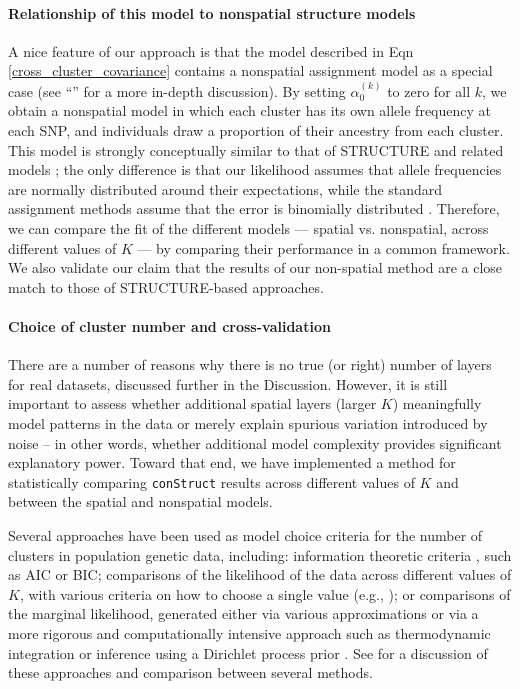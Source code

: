 \documentclass[12pt]{article}
\newcommand{\secref}[1]{``\nameref{#1}''}
\begin{document}
\paragraph{Relationship of this model to nonspatial structure models}

A nice feature of our approach is that the model described in Eqn \eqref{cross_cluster_covariance} 
contains a nonspatial assignment model as a special case 
(see \secref{model_app} for a more in-depth discussion). 
By setting $\alpha_0^{(k)}$ to zero for all $k$, 
we obtain a nonspatial model in which each cluster has its own allele frequency at each SNP, 
and individuals draw a proportion of their ancestry from each cluster. 
This model is strongly conceptually similar to that of STRUCTURE \citep{STRUCTURE} 
and related models \citep[e.g.][]{ADMIXTURE}; 
the only difference is that our likelihood assumes that allele frequencies are normally distributed 
around their expectations, 
while the standard assignment methods assume that the error is binomially distributed \citep{Engelhardt2012}.  
Therefore, we can compare the fit of the different models 
--- spatial vs. nonspatial, across different values of $K$ --- 
by comparing their performance in a common framework. 
We also validate our claim that the results of our non-spatial method 
are a close match to those of STRUCTURE-based approaches.

\paragraph{Choice of cluster number and cross-validation}
There are a number of reasons 
why there is no true (or right) number of layers for real datasets,
discussed further in the Discussion.
However, it is still important to assess whether additional spatial layers (larger $K$)
meaningfully model patterns in the data
or merely explain spurious variation introduced by noise
-- in other words, whether additional model complexity
provides significant explanatory power.
Toward that end, we have implemented a method for 
statistically comparing \texttt{conStruct} results across different values of $K$ 
and between the spatial and nonspatial models.

Several approaches have been used as model choice criteria 
for the number of clusters in population genetic data, including: 
information theoretic criteria \citep[e.g.][]{ADMIXTURE}, such as AIC or BIC;
comparisons of the likelihood of the data across different values of $K$, 
with various criteria on how to choose a single value (e.g., \citep{Evanno2005});
or comparisons of the marginal likelihood, 
generated either via various approximations \citep[e.g.][]{STRUCTURE}
or via a more rigorous and computationally intensive approach such as thermodynamic integration \citep{verity_nichols2016}
or inference using a Dirichlet process prior \citep{huelsenbeck2007inference}.
See \cite{verity_nichols2016} for a discussion of these approaches and comparison
between several methods.
\end{document}
